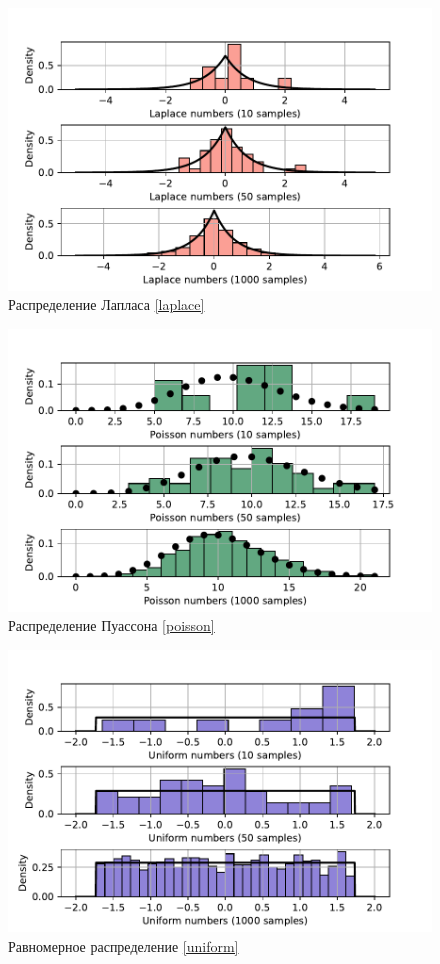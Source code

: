 \documentclass[a4paper]{article}
\begin{document}
\begin{figure}[H]
    \centering
    \includegraphics[width = 16 cm]{resources/laplaceNumbers.pdf}
    \caption{Распределение Лапласа \eqref{laplace}}
    \label{fig:laplace}
\end{figure}
\begin{figure}[H]
    \centering
    \includegraphics[width = 16 cm]{resources/poissonNumbers.pdf}
    \caption{Распределение Пуассона \eqref{poisson}}
    \label{fig:poisson}
\end{figure}
\begin{figure}[H]
    \centering
    \includegraphics[width = 16 cm]{resources/uniformNumbers.pdf}
    \caption{Равномерное распределение \eqref{uniform}}
    \label{fig:uniform}
\end{figure}
\end{document}
